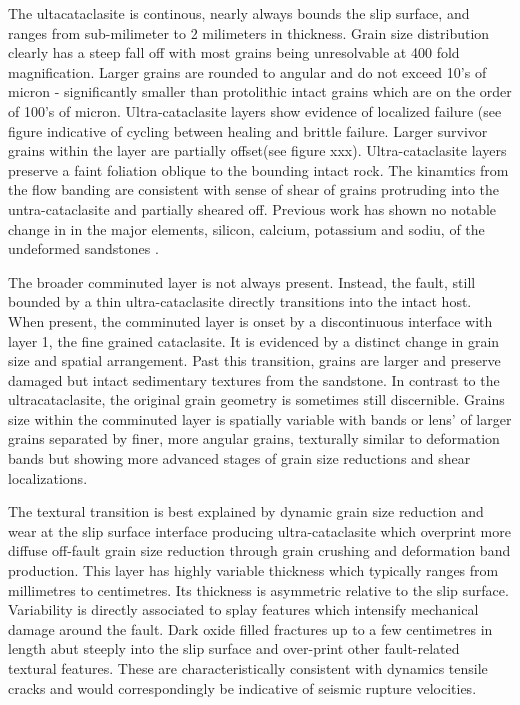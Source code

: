 \documentclass[12pt,a4paper]{article}
\begin{document}
The ultacataclasite is continous, nearly always bounds the slip surface, and ranges from sub-milimeter to 2 milimeters in thickness. Grain size distribution clearly has a steep fall off with most grains being unresolvable at 400 fold magnification. Larger grains are rounded to angular and do not exceed 10's of micron - significantly smaller than protolithic intact grains which are on the order of 100's of micron. Ultra-cataclasite layers show evidence of localized failure (see figure indicative of cycling between healing and brittle failure. Larger survivor grains within the layer are partially offset(see figure xxx). Ultra-cataclasite layers preserve a faint foliation oblique to the bounding intact rock. The kinamtics from the flow banding are consistent with sense of shear of grains protruding into the untra-cataclasite and partially sheared off. Previous work has shown no notable change in in the major elements, silicon, calcium, potassium and sodiu, of the undeformed sandstones  \cite{aydin1977faulting}.

The broader comminuted layer is not always present. Instead, the fault, still bounded by a thin ultra-cataclasite directly transitions into the intact host. When present, the comminuted layer is onset by a discontinuous interface with layer 1, the fine grained cataclasite. It is evidenced by a distinct change in grain size and spatial arrangement. Past this transition, grains are larger and preserve damaged but intact sedimentary textures from the sandstone. In contrast to the ultracataclasite, the original grain geometry is sometimes still discernible. Grains size within the comminuted layer is spatially variable with bands or lens' of larger grains separated by finer, more angular grains, texturally similar to deformation bands but showing more advanced stages of grain size reductions and shear localizations.

The textural transition is best explained  by dynamic grain size reduction and wear at the slip surface interface producing ultra-cataclasite which overprint more diffuse off-fault grain size reduction through grain crushing and deformation band production. This layer has highly variable thickness which typically ranges from millimetres to centimetres. Its thickness is asymmetric relative to the slip surface. Variability is directly associated to splay features which intensify mechanical damage around the fault.
Dark oxide filled fractures up to a few centimetres in length abut steeply into the slip surface and over-print other fault-related textural features. These are characteristically consistent with dynamics tensile cracks and would correspondingly be indicative of seismic rupture velocities.
\end{document}
